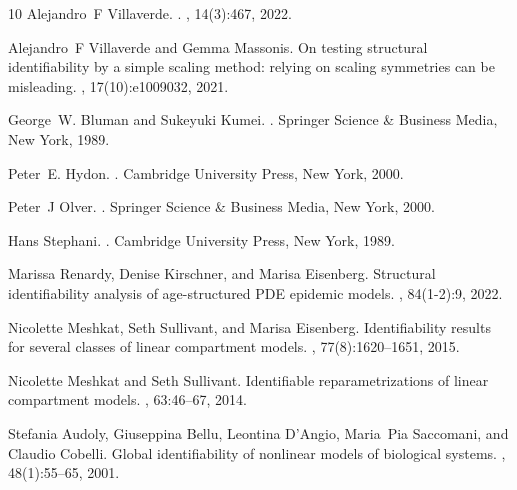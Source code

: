 \documentclass[12pt]{article}
\begin{document}
\begin{thebibliography}{10}
Alejandro~F Villaverde.
.
, 14(3):467, 2022.

Alejandro~F Villaverde and Gemma Massonis.
\newblock On testing structural identifiability by a simple scaling method:
  relying on scaling symmetries can be misleading.
, 17(10):e1009032, 2021.

George~W. Bluman and Sukeyuki Kumei.
.
\newblock Springer Science {\&} Business Media, New York, 1989.

Peter~E. Hydon.
.
\newblock Cambridge University Press, New York, 2000.

Peter~J Olver.
.
\newblock Springer Science {\&} Business Media, New York, 2000.

Hans Stephani.
.
\newblock Cambridge University Press, New York, 1989.

Marissa Renardy, Denise Kirschner, and Marisa Eisenberg.
\newblock Structural identifiability analysis of age-structured {PDE} epidemic
  models.
, 84(1-2):9, 2022.

Nicolette Meshkat, Seth Sullivant, and Marisa Eisenberg.
\newblock Identifiability results for several classes of linear compartment
  models.
, 77(8):1620--1651, 2015.

Nicolette Meshkat and Seth Sullivant.
\newblock Identifiable reparametrizations of linear compartment models.
, 63:46--67, 2014.

Stefania Audoly, Giuseppina Bellu, Leontina D'Angio, Maria~Pia Saccomani, and
  Claudio Cobelli.
\newblock Global identifiability of nonlinear models of biological systems.
, 48(1):55--65,
  2001.


\end{thebibliography}
\end{document}
